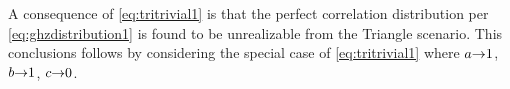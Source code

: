 {A consequence of \cref{eq:tritrivial1} is that the perfect correlation distribution per \cref{eq:ghzdistribution1} 
is found to be unrealizable from the Triangle scenario. This conclusions follows by considering the special case of \cref{eq:tritrivial1} where $a\mathord{\to}1$, $b\mathord{\to}1$, $c\mathord{\to}0$.


}
